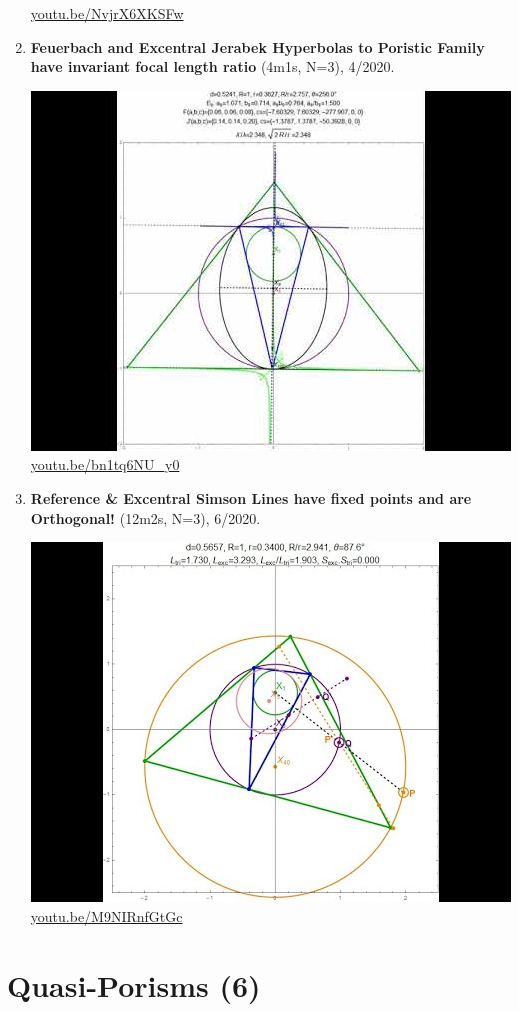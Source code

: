 \documentclass[12pt]{amsart}
\begin{document}
\begin{enumerate}[resume]
\begin{center}
\href{https://youtu.be/NvjrX6XKSFw}{\url{youtu.be/NvjrX6XKSFw}}\end{center}
% 
\item \textbf{Feuerbach and Excentral Jerabek Hyperbolas to Poristic Family have invariant focal length ratio} (4m1s, N=3), 4/2020. 
\begin{center}\includegraphics[width=.5\textwidth]{pics/bn1tq6NU_y0.jpg} \\ 
\href{https://youtu.be/bn1tq6NU_y0}{\url{youtu.be/bn1tq6NU\_y0}}\end{center}
% 
\item \textbf{Reference \& Excentral Simson Lines have fixed points and are Orthogonal!} (12m2s, N=3), 6/2020. 
\begin{center}\includegraphics[width=.5\textwidth]{pics/M9NIRnfGtGc.jpg} \\ 
\href{https://youtu.be/M9NIRnfGtGc}{\url{youtu.be/M9NIRnfGtGc}}\end{center}
% 
\end{enumerate}

\section{Quasi-Porisms (6)}
\end{document}
